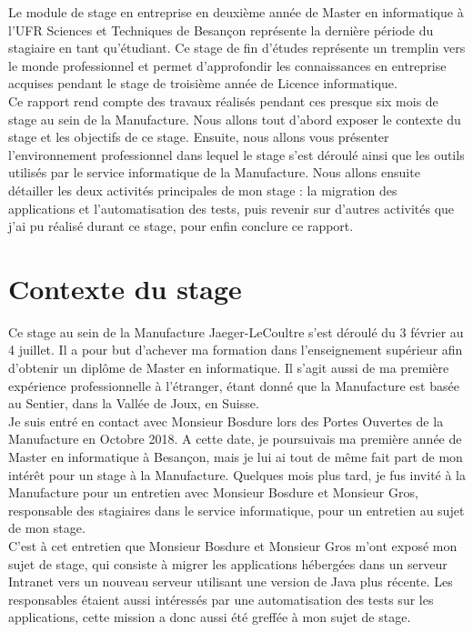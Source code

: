 
Le module de stage en entreprise en deuxième année de Master en informatique à l'UFR Sciences et Techniques de Besançon représente la dernière période du stagiaire en tant qu'étudiant. Ce stage de fin d'études représente un tremplin vers le monde professionnel et permet d'approfondir les connaissances en entreprise acquises pendant le stage de troisième année de Licence informatique. \\

Ce rapport rend compte des travaux réalisés pendant ces presque six mois de stage au sein de la Manufacture. Nous allons tout d'abord exposer le contexte du stage et les objectifs de ce stage. Ensuite, nous allons vous présenter l'environnement professionnel dans lequel le stage s'est déroulé ainsi que les outils utilisés par le service informatique de la Manufacture. Nous allons ensuite détailler les deux activités principales de mon stage : la migration des applications et l'automatisation des tests, puis revenir sur d'autres activités que j'ai pu réalisé durant ce stage, pour enfin conclure ce rapport.

\section{Contexte du stage}

Ce stage au sein de la Manufacture Jaeger-LeCoultre s'est déroulé du 3 février au 4 juillet. Il a pour but d'achever ma formation dans l'enseignement supérieur afin d'obtenir un diplôme de Master en informatique. Il s'agit aussi de ma première expérience professionnelle à l'étranger, étant donné que la Manufacture est basée au Sentier, dans la Vallée de Joux, en Suisse. \\

Je suis entré en contact avec Monsieur Bosdure lors des Portes Ouvertes de la Manufacture en Octobre 2018. A cette date, je poursuivais ma première année de Master en informatique à Besançon, mais je lui ai tout de même fait part de mon intérêt pour un stage à la Manufacture. Quelques mois plus tard, je fus invité à la Manufacture pour un entretien avec Monsieur Bosdure et Monsieur Gros, responsable des stagiaires dans le service informatique, pour un entretien au sujet de mon stage. \\

C'est à cet entretien que Monsieur Bosdure et Monsieur Gros m'ont exposé mon sujet de stage, qui consiste à migrer les applications hébergées dans un serveur Intranet vers un nouveau serveur utilisant une version de Java plus récente. Les responsables étaient aussi intéressés par une automatisation des tests sur les applications, cette mission a donc aussi été greffée à mon sujet de stage. 


